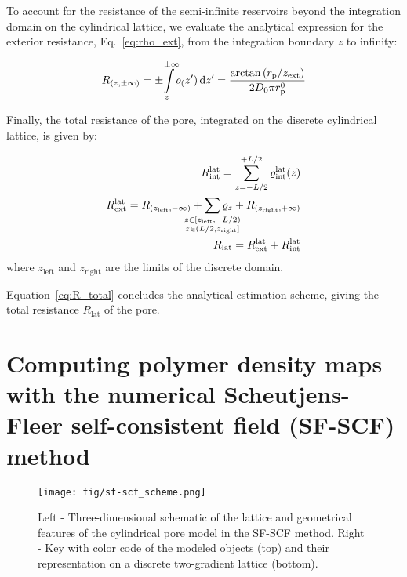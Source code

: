 \documentclass[10pt, a4paper, twocolumn]{article}
\begin{document}
To account for the resistance of the semi-infinite reservoirs beyond the integration domain on the cylindrical lattice, we evaluate the analytical expression for the exterior resistance, Eq.~\eqref{eq:rho_ext}, from the integration boundary $z$ to infinity:

\begin{eqnarray}
    \label{eq:r_reservoir}
    R_{(z, \pm\infty)} = \pm\!\! \int\displaylimits_{z}^{\pm\infty}\!\! \varrho_(z') \, \text{d}z' = \frac{\arctan\left({r_{\text{p}}}/{z_{\text{ext}}} \right)}{2 D_0 \pi r_{\text{p}}^{0}}
\end{eqnarray}

Finally, the total resistance of the pore, integrated on the discrete cylindrical lattice, is given by:

\begin{eqnarray}
    R_{\text{int}}^{\text{lat}} = \sum_{z=-L/2}^{+L/2} \varrho_{\text{int}}^{\text{lat}}(z)
    \\
    R_{\text{ext}}^{\text{lat}} = R_{(z_{\text{left}}, -\infty)} + \sum\limits_{\mathclap{\substack{z \in [z_{\text{left}},-L/2)\\z \in (L/2, z_\text{right}]}}} \varrho_{z} + R_{(z_{\text{right}}, +\infty)}
    \\
    \label{eq:R_total}
    R_{\text{lat}} = R_{\text{ext}}^{\text{lat}} + R_{\text{int}}^{\text{lat}}
\end{eqnarray}
where $z_{\text{left}}$ and $z_{\text{right}}$ are the limits of the discrete domain.

Equation~\eqref{eq:R_total} concludes the analytical estimation scheme, giving the total resistance $R_{\text{lat}}$ of the pore.


\pagebreak
\section{Computing polymer density maps with the numerical Scheutjens-Fleer self-consistent field (SF-SCF) method}

\begin{figure}[h]
    \centering
    \texttt{[image: fig/sf-scf\_scheme.png]}
    \caption{
    Left - Three-dimensional schematic of the lattice and geometrical features of the cylindrical pore model in the SF-SCF method.
    Right - Key with color code of the modeled objects (top) and their representation on a discrete two-gradient lattice (bottom).
    }
    \label{fig:sf-scf_scheme}
\end{figure}
\end{document}
